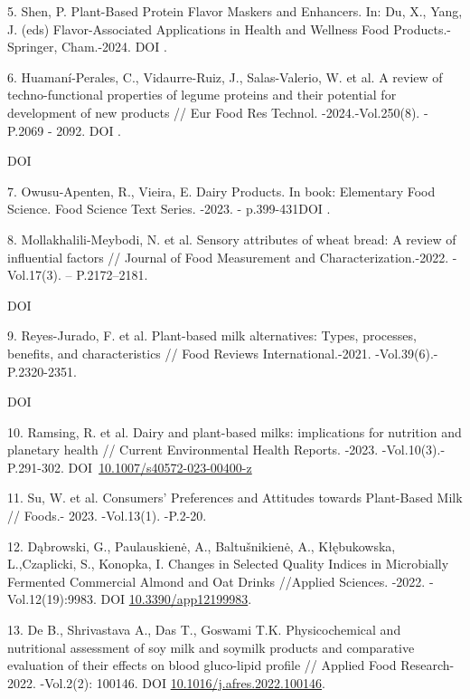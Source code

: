 5. Shen, P. Plant-Based Protein Flavor Maskers and Enhancers. In: Du, X.,
Yang, J. (eds) Flavor-Associated Applications in Health and Wellness
Food Products.-Springer, Cham.-2024. DOI
\href{https://doi.org/10.1007/978-3-031-51808-9_13}{}.

6. Huamaní-Perales, C., Vidaurre-Ruiz, J., Salas-Valerio, W. et al. A
review of techno-functional properties of legume proteins and their
potential for development of new products // Eur Food Res Technol.
-2024.-Vol.250(8). - P.2069 - 2092. DOI
\href{https://doi.org/10.1007/s00217-024-04536-6}{}.

DOI
\href{http://dx.doi.org/10.1007/978-3-030-65433-7_18}{}

7. Owusu-Apenten, R., Vieira, E. Dairy Products. In book: Elementary Food
Science. Food Science Text Series. -2023. - p.399-431DOI
\href{https://doi.org/10.1007/978-3-030-65433-7_18}{}.

8. Mollakhalili-Meybodi, N. et al. Sensory attributes of wheat bread: A
review of influential factors // Journal of Food Measurement and
Characterization.-2022. - Vol.17(3). -- P.2172--2181.

DOI
\href{http://dx.doi.org/10.1007/s11694-022-01765-9}{}

9. Reyes-Jurado, F. et al. Plant-based milk alternatives: Types,
processes, benefits, and characteristics // Food Reviews
International.-2021. -Vol.39(6).- P.2320-2351.

DOI
\href{http://dx.doi.org/10.1080/87559129.2021.1952421}{}

10. Ramsing, R. et al. Dairy and plant-based milks: implications for
nutrition and planetary health // Current Environmental Health Reports.
-2023. -Vol.10(3).-P.291-302.
DOI~\href{https://doi.org/10.1007/s40572-023-00400-z}{10.1007/s40572-023-00400-z}

11. Su, W. et al. Consumers' Preferences and Attitudes towards
Plant-Based Milk // Foods.- 2023. -Vol.13(1). -P.2-20.
\href{https://doi.org/10.3390/foods13010002}{}

12. Dąbrowski, G., Paulauskienė, A., Baltušnikienė, A., Kłębukowska,
L.,Czaplicki, S., Konopka, I. Changes in Selected Quality Indices in
Microbially Fermented Commercial Almond and Oat Drinks //Applied
Sciences. -2022. -Vol.12(19):9983. DOI
\href{https://doi.org/10.3390/app12199983}{10.3390/app12199983}.

13. De B., Shrivastava A., Das T., Goswami T.K. Physicochemical and
nutritional assessment of soy milk and soymilk products and comparative
evaluation of their effects on blood gluco-lipid profile // Applied Food
Research-2022. -Vol.2(2): 100146. DOI
\href{https://doi.org/10.1016/j.crfs.2022.100146}{10.1016/j.afres.2022.100146}.

